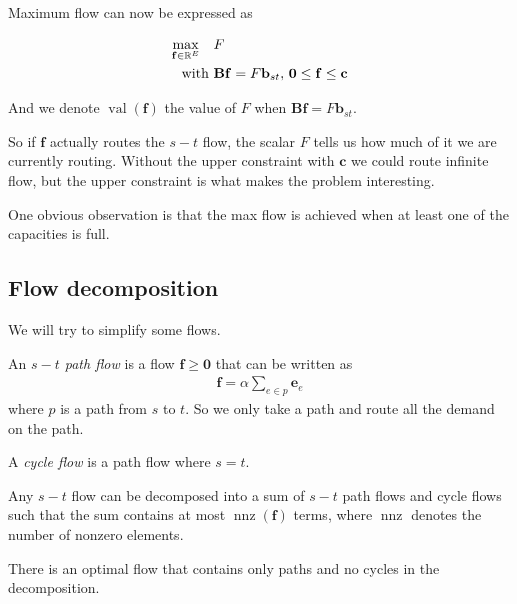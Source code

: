Maximum flow can now be expressed as

\begin{align}
    \max_{\mathbf{f} \in \mathbb{R}^E}  \quad &F \\
    \text{with } &\mathbf{B}\mathbf{f} = F \mathbf{b}_{st}, \, \mathbf{0} \leq \mathbf{f} \leq \mathbf{c} \nonumber
\end{align}

And we denote $\operatorname{val}(\mathbf{f})$ the value of $F$ when $\mathbf{B}\mathbf{f} = F \mathbf{b}_{st}$.

So if $\mathbf{f}$ actually routes the $s-t$ flow, the scalar $F$ tells us how much of it we are currently routing. Without the upper constraint with $\mathbf{c}$ we could route infinite flow, but the upper constraint is what makes the problem interesting.

One obvious observation is that the max flow is achieved when at least one of the capacities is full.

\subsection{Flow decomposition}
We will try to simplify some flows.
\begin{definicija}
    An \emph{$s-t$ path flow} is a flow $\mathbf{f} \geq \mathbf{0}$ that can be written as 
    \begin{align*}
        \mathbf{f} = \alpha \sum_{e \in p} \mathbf{e}_e
    \end{align*}
    where $p$ is a path from $s$ to $t$. So we only take a path and route all the demand on the path.
\end{definicija}

\begin{definicija}
    A \emph{cycle flow} is a path flow where $s = t$.
\end{definicija}

\begin{lema}

Any $s-t$ flow can be decomposed into a sum of $s-t$ path flows and cycle flows such that the sum contains at most $\operatorname{nnz}(\mathbf{f})$ terms, where $\operatorname{nnz}$ denotes the number of nonzero elements.

There is an optimal flow that contains only paths and no cycles in the decomposition.
    
\end{lema}

